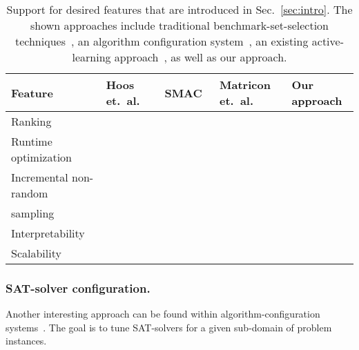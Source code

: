 \documentclass[runningheads]{llncs}
\newcommand{\cmark}{\ding{51}} %
\newcommand{\xmark}{\ding{55}}
\begin{document}


\begin{table}[tbp]
  \centering
  \caption{
  	Support for desired features that are introduced in Sec.~\ref{sec:intro}.
  	The shown approaches include traditional benchmark-set-selection techniques~\cite{HoosKSS13}, an algorithm configuration system~\cite{HutterHL11}, an existing active-learning approach~\cite{MatriconAFSH21}, as well as our approach.
  }
  \label{tab:requirements}
  \vspace{0.2cm}
  \begin{tabular}{
    m{}
    >{\centering\arraybackslash}m{}
    >{\centering\arraybackslash}m{}
    >{\centering\arraybackslash}m{}
    >{\centering\arraybackslash}m{}
  }
    \hline
    Feature & Hoos \mbox{et. al.~\cite{HoosKSS13}} & SMAC~\cite{HutterHL11} & Matricon \mbox{et. al.~\cite{MatriconAFSH21}} & Our approach \\
    \hline
    Ranking & \cmark & \xmark & \cmark & \cmark \\
    Runtime optimization & \xmark & \cmark & \cmark & \cmark \\
    Incremental non-random\\ sampling & \xmark & \xmark & \cmark & \cmark \\
    Interpretability & \cmark & \xmark & \xmark & \cmark \\
    Scalability & \cmark & \cmark & \xmark & \cmark \\
    \hline
  \end{tabular}
\end{table}

\subsubsection{SAT-solver configuration.}
Another interesting approach can be found within algorithm-configuration systems~\cite{HutterHL11,HoosHL21,Stutzle0P22}.
The goal is to tune SAT-solvers for a given sub-domain of problem instances.
\end{document}
